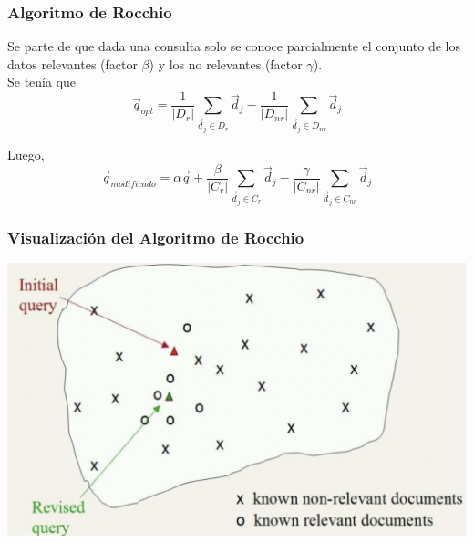\documentclass[
10pt, %
aspectratio=169, %
]{beamer}
\begin{document}
	\begin{frame}
		
		\frametitle{Algoritmo de Rocchio}
		
		Se parte de que dada una consulta solo se conoce parcialmente el conjunto de los datos relevantes (factor $\beta$) y los no relevantes (factor $\gamma$). \\[2mm]
		
		Se tenía que 
		$$
		\vec{q}_{opt} = 
		\frac{1}{|D_r|} \sum_{\vec{d}_j \in D_r} \vec{d}_j 
		- \frac{1}{|D_{nr}|} \sum_{\vec{d}_j \in D_{nr}} \vec{d}_j 
		$$
		
		Luego,
		$$
			\vec{q}_{modificado} = 
				\alpha \vec{q} 
				+ \frac{\beta}{|C_r|} \sum_{\vec{d}_j \in C_r} \vec{d}_j 
				- \frac{\gamma}{|C_{nr}|} \sum_{\vec{d}_j \in C_{nr}} \vec{d}_j 
		$$
		
		\vspace{1\baselineskip}
		
		
	\end{frame}
	
	\begin{frame}
		
		\frametitle{Visualización del Algoritmo de Rocchio}
		
		\centering
		\includegraphics[scale=0.35]{q2.png}
		
	\end{frame}
	
\end{document}

